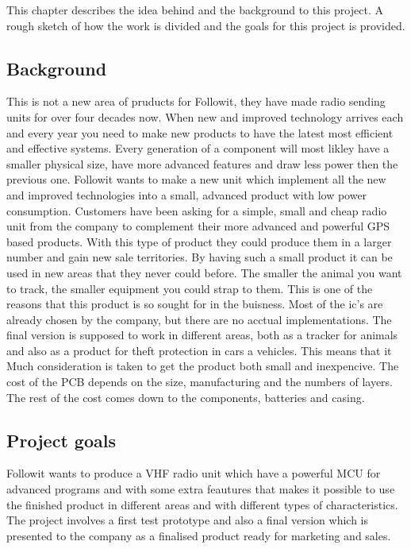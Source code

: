 This chapter describes the idea behind and the background to this project. A rough sketch of how the work is divided and the goals for this project is provided.

\subsection{Background}
This is not a new area of pruducts for Followit, they have made radio sending units for over four decades now.
When new and improved technology arrives each and every year you need to make new products to have the latest most efficient and effective systems. Every generation of a component will most likley have a smaller physical size, have more advanced features and draw less power then the previous one. Followit wants to make a new unit which implement all the new and improved technologies into a small, advanced product with low power consumption. 
Customers have been asking for a simple, small and cheap radio unit from the company to complement their more advanced and powerful GPS based products. With this type of product they could produce them in a larger number and gain new sale territories. By having such a small product it can be used in new areas that they never could before. The smaller the animal you want to track, the smaller equipment you could strap to them. This is one of the reasons that this product is so sought for in the buisness. Most of the \gls{ic}'s are already chosen by the company, but there are no acctual implementations. The final version is supposed to work in different areas, both as a tracker for animals and also as a product for theft protection in cars a vehicles. This means that it  Much consideration is taken to get the product both small and inexpencive. The cost of the PCB depends on the size, manufacturing and the numbers of layers. The rest of the cost comes down to the components, batteries and casing.    \\

\subsection{Project goals}
Followit wants to produce a VHF radio unit which have a powerful MCU for advanced programs and with some extra feautures that makes it possible to use the finished product in different areas and with different types of characteristics. The project involves a first test prototype and also a final version which is presented to the company as a finalised product ready for marketing and sales. 

